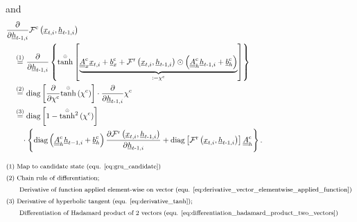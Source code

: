 and
\begin{align} \label{eq:gru_grad_candidate_2_previous_hidden}
    &\frac{\partial}{\partial \underline h_{t\text{-}1, i}}
    \mathcal{F}^\text{c}\left(\underline x_{t, i}, \underline h_{t\text -1, i}\right)
    \nonumber \\ & \quad \overset{\textcolor{black}{(1)}}{=}
    \frac{\partial}{\partial \underline h_{t\text{-}1, i}}
    \left\{
        \overset{\scriptscriptstyle \odot}{\tanh} \left[
            \underbrace{
            \underline{\underline A}^\text{c}_{x}
            \underline x_{t,i}
            +
            \underline b^\text{c}_{x}
            +
            \mathcal{F}^\text{r}\left(\underline x_{t, i}, \underline h_{t\text -1, i}\right)
            \odot
            \left(
                \underline{\underline A}^\text{c}_{h}
                \underline h_{t\text -1,i}
                +
                \underline b^\text{c}_{h}
            \right)}_{:=\chi^\text{c}}
        \right]
    \right\}
    \nonumber \\ & \quad \overset{\textcolor{black}{(2)}}{=}
    \mathrm{diag} \left[
        \frac{\partial}{\partial \chi^\text{c}}
        \overset{\scriptscriptstyle \odot}{\tanh} \left(\chi^\text{c}\right)
    \right] 
    \cdot 
    \frac{\partial}{\partial \underline h_{t\text{-}1, i}} \chi^\text{c}
    \nonumber \\ & \quad \overset{\textcolor{black}{(3)}}{=}
    \mathrm{diag} \left[
        1 - \overset{\scriptscriptstyle \odot}{\tanh}{}^2 \left(\chi^\text{c}\right)
    \right] 
    \nonumber \\ &\quad \quad  \cdot
    \left\{
        \mathrm{diag} \left(
            \underline{\underline A}^\text{c}_{h}
            \underline h_{t-1,i}
            +
            \underline b^\text{c}_{h}
        \right)
        \frac{\partial \mathcal{F}^\text{r}\left(\underline x_{t, i}, \underline h_{t\text -1, i}\right)}
        {\partial \underline h_{t\text -1, i}}
        +
        \mathrm{diag}\left[
            \mathcal{F}^\text{r}\left(\underline x_{t, i}, \underline h_{t\text -1, i}\right)
        \right]
        \underline{\underline A}^\text{c}_{h}
    \right\}.
    \\[2ex]
        &\textcolor{black}{\text{\footnotesize (1)
            Map to candidate state (equ. \ref{eq:gru_candidate})
        }} \nonumber \\
        &\textcolor{black}{\text{\footnotesize (2) 
            Chain rule of differentiation;  
        }} \nonumber \\
        &\textcolor{black}{\text{\footnotesize \qquad 
            Derivative of function applied element-wise on vector
            (equ. \ref{eq:derivative_vector_elementwise_applied_function})
        }} \nonumber \\
        &\textcolor{black}{\text{\footnotesize (3) 
            Derivative of hyperbolic tangent (equ. \ref{eq:derivative_tanh}); 
        }} \nonumber \\
        &\textcolor{black}{\text{\footnotesize \qquad
            Differentiation of Hadamard product of 2 vectors 
            (equ. \ref{eq:differentiation_hadamard_product_two_vectors})
        }} \nonumber
\end{align}
